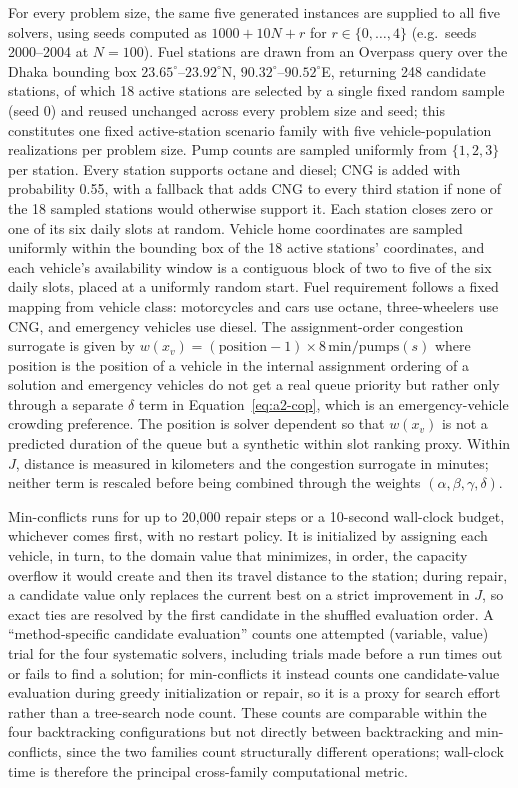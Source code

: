 \documentclass{ai-lab-report}
\begin{document}
For every problem size, the same five generated instances are supplied to all five solvers, using seeds computed as $1000+10N+r$ for $r\in\{0,\dots,4\}$ (e.g.\ seeds 2000--2004 at $N=100$). Fuel stations are drawn from an Overpass query over the Dhaka bounding box $23.65^\circ$--$23.92^\circ$N, $90.32^\circ$--$90.52^\circ$E, returning 248 candidate stations, of which 18 active stations are selected by a single fixed random sample (seed 0) and reused unchanged across every problem size and seed; this constitutes one fixed active-station scenario family with five vehicle-population realizations per problem size. Pump counts are sampled uniformly from $\{1,2,3\}$ per station. Every station supports octane and diesel; CNG is added with probability 0.55, with a fallback that adds CNG to every third station if none of the 18 sampled stations would otherwise support it. Each station closes zero or one of its six daily slots at random. Vehicle home coordinates are sampled uniformly within the bounding box of the 18 active stations' coordinates, and each vehicle's availability window is a contiguous block of two to five of the six daily slots, placed at a uniformly random start. Fuel requirement follows a fixed mapping from vehicle class: motorcycles and cars use octane, three-wheelers use CNG, and emergency vehicles use diesel. The assignment-order congestion surrogate is given by $w(x_v) = (\mathrm{position}-1)\times 8\,\mathrm{min}/\mathrm{pumps}(s)$ where position is the position of a vehicle in the internal assignment ordering of a solution and emergency vehicles do not get a real queue priority but rather only through a separate $\delta$ term in Equation~\eqref{eq:a2-cop}, which is an emergency-vehicle crowding preference. The position is solver dependent so that $w(x_v)$ is not a predicted duration of the queue but a synthetic within slot ranking proxy. Within $J$, distance is measured in kilometers and the congestion surrogate in minutes; neither term is rescaled before being combined through the weights $(\alpha,\beta,\gamma,\delta)$.

Min-conflicts runs for up to 20,000 repair steps or a 10-second wall-clock budget, whichever comes first, with no restart policy. It is initialized by assigning each vehicle, in turn, to the domain value that minimizes, in order, the capacity overflow it would create and then its travel distance to the station; during repair, a candidate value only replaces the current best on a strict improvement in $J$, so exact ties are resolved by the first candidate in the shuffled evaluation order. A ``method-specific candidate evaluation'' counts one attempted (variable, value) trial for the four systematic solvers, including trials made before a run times out or fails to find a solution; for min-conflicts it instead counts one candidate-value evaluation during greedy initialization or repair, so it is a proxy for search effort rather than a tree-search node count. These counts are comparable within the four backtracking configurations but not directly between backtracking and min-conflicts, since the two families count structurally different operations; wall-clock time is therefore the principal cross-family computational metric.
\end{document}

